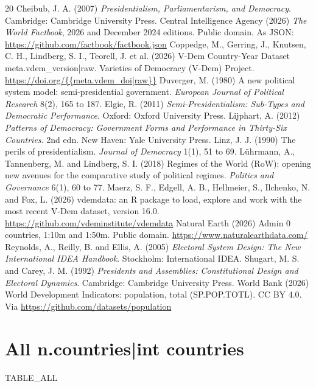 \documentclass[11pt,a4paper]{article}
\begin{document}
\begin{thebibliography}{20}
 Cheibub, J. A. (2007) \emph{Presidentialism, Parliamentarism, and Democracy}. Cambridge: Cambridge University Press.
 Central Intelligence Agency (2026) \emph{The World Factbook}, 2026 and December 2024 editions. Public domain. As JSON: \url{https://github.com/factbook/factbook.json}
 Coppedge, M., Gerring, J., Knutsen, C. H., Lindberg, S. I., Teorell, J. et al. (2026) V-Dem Country-Year Dataset {{meta.vdem_version|raw}}. Varieties of Democracy (V-Dem) Project. \url{https://doi.org/{{meta.vdem_doi|raw}}}
 Duverger, M. (1980) A new political system model: semi-presidential government. \emph{European Journal of Political Research} 8(2), 165 to 187.
 Elgie, R. (2011) \emph{Semi-Presidentialism: Sub-Types and Democratic Performance}. Oxford: Oxford University Press.
 Lijphart, A. (2012) \emph{Patterns of Democracy: Government Forms and Performance in Thirty-Six Countries}. 2nd edn. New Haven: Yale University Press.
 Linz, J. J. (1990) The perils of presidentialism. \emph{Journal of Democracy} 1(1), 51 to 69.
 Lührmann, A., Tannenberg, M. and Lindberg, S. I. (2018) Regimes of the World (RoW): opening new avenues for the comparative study of political regimes. \emph{Politics and Governance} 6(1), 60 to 77.
 Maerz, S. F., Edgell, A. B., Hellmeier, S., Ilchenko, N. and Fox, L. (2026) vdemdata: an R package to load, explore and work with the most recent V-Dem dataset, version 16.0. \url{https://github.com/vdeminstitute/vdemdata}
 Natural Earth (2026) Admin 0 countries, 1:10m and 1:50m. Public domain. \url{https://www.naturalearthdata.com/}
 Reynolds, A., Reilly, B. and Ellis, A. (2005) \emph{Electoral System Design: The New International IDEA Handbook}. Stockholm: International IDEA.
 Shugart, M. S. and Carey, J. M. (1992) \emph{Presidents and Assemblies: Constitutional Design and Electoral Dynamics}. Cambridge: Cambridge University Press.
 World Bank (2026) World Development Indicators: population, total (SP.POP.TOTL). CC BY 4.0. Via \url{https://github.com/datasets/population}
\end{thebibliography}

\clearpage
\appendix
\section{All {{n.countries|int}} countries}
{{TABLE_ALL}}
\end{document}
